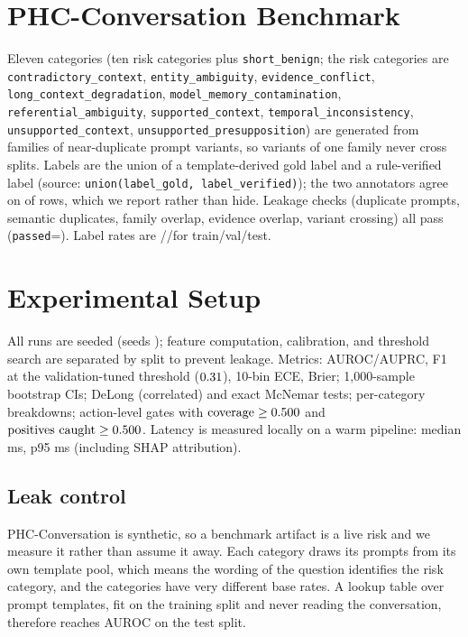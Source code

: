 \documentclass[conference,a4paper]{IEEEtran}
\begin{document}
\section{PHC-Conversation Benchmark}
Eleven categories (ten risk categories plus \texttt{short\_benign}; the risk
categories are \texttt{contradictory\_context}, \texttt{entity\_ambiguity},
\texttt{evidence\_conflict}, \texttt{long\_context\_degradation},
\texttt{model\_memory\_contamination}, \texttt{referential\_ambiguity},
\texttt{supported\_context}, \texttt{temporal\_inconsistency},
\texttt{unsupported\_context}, \texttt{unsupported\_presupposition}) are
generated from \nfamilies{} families of near-duplicate prompt variants, so
variants of one family never cross splits. Labels are the union of a
template-derived gold label and a rule-verified label (source:
\texttt{union(label\_gold, label\_verified)}); the two annotators agree on
\agreement{} of rows, which we report rather than hide. Leakage checks
(duplicate prompts, semantic duplicates, family overlap, evidence overlap,
variant crossing) all pass (\texttt{passed}=\leakage). Label rates are
 \trainrate/\valrate/\testrate for train/val/test.

\section{Experimental Setup}
All runs are seeded (seeds \msses{}); feature computation, calibration, and
threshold search are separated by split to prevent leakage. Metrics:
AUROC/AUPRC, F1 at the validation-tuned threshold ($0.31$), 10-bin ECE,
Brier; 1{,}000-sample bootstrap CIs; DeLong (correlated) and exact McNemar
tests; per-category breakdowns; action-level gates with
$\text{coverage}\ge0.500$ and
$\text{positives caught}\ge0.500$. Latency is measured locally on a
warm pipeline: median \latmedian{} ms, p95 \lathigh{} ms (including SHAP
attribution).

\subsection{Leak control}
\label{sec:leakcontrol}
PHC-Conversation is synthetic, so a benchmark artifact is a live risk and we
measure it rather than assume it away. Each category draws its prompts from
its own template pool, which means the wording of the question identifies
the risk category, and the categories have very different base rates. A
lookup table over prompt templates, fit on the training split and never
reading the conversation, therefore reaches AUROC \lookupauroc{} on the test
split.
\end{document}
